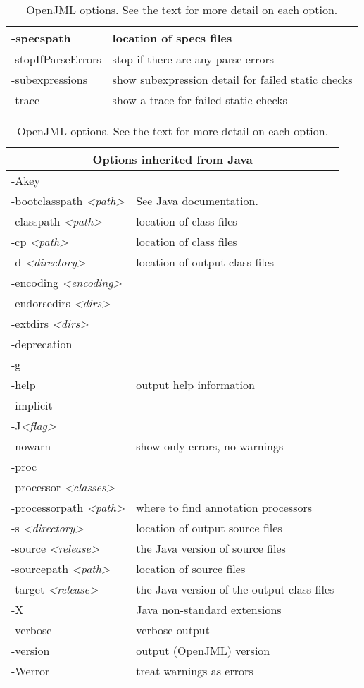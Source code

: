 \documentclass{report}%
\begin{document}
\begin{table}
{\begin{tabular}{|l|p{1.4in}|}
-specspath & location of specs files\\ \hline
-stopIfParseErrors & stop if there are any parse errors \\ \hline
-subexpressions & show subexpression detail for failed static checks\\ \hline
-trace & show a trace for failed static checks\\ \hline
\end{tabular}
}
\qquad
\parbox{.5\textwidth}{
\begin{tabular}{|l|p{1.4in}|}
\hline
\multicolumn{2}{|c|}{Options inherited from Java} \\
\hline
-Akey & \\ \hline
-bootclasspath {\it <path>}& See Java documentation. \\ \hline
-classpath {\it <path>}& location of class files \\ \hline
-cp {\it <path>}& location of class files\\ \hline
-d {\it <directory>} & location of output class files\\ \hline
-encoding {\it <encoding>} & \\ \hline
-endorsedirs {\it <dirs>} & \\ \hline
-extdirs {\it <dirs>} & \\ \hline
-deprecation & \\ \hline
-g & \\ \hline
-help & output help information\\ \hline
-implicit & \\ \hline
-J{\it <flag>} & \\ \hline
-nowarn & show only errors, no warnings \\ \hline
-proc & \\ \hline
-processor {\it <classes>} & \\ \hline
-processorpath {\it <path>} & where to find annotation processors\\ \hline
-s {\it <directory>} & location of output source files\\ \hline
-source {\it <release>} & the Java version of source files\\ \hline
-sourcepath {\it <path>} & location of source files\\ \hline
-target {\it <release>} & the Java version of the output class files\\ \hline
-X & Java non-standard extensions\\ \hline
-verbose & verbose output \\ \hline
-version & output (OpenJML) version\\ \hline
-Werror & treat warnings as errors \\ \hline

\end{tabular}
}
\caption{OpenJML options. See the text for more detail on each option.}
\label{Tab:Options}
\end{table}
\end{document}
